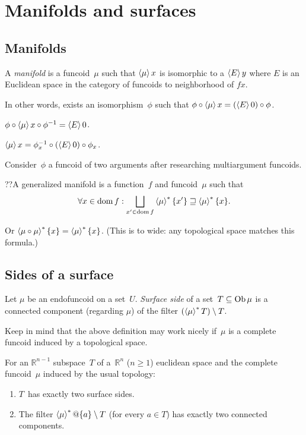 \chapter{Manifolds and surfaces}

\section{Manifolds}

\begin{defn}
 A \emph{manifold} is a funcoid~$\mu$
 such that
 $\left\langle \mu\right\rangle x$ is isomorphic to a $\left\langle E\right\rangle y$ where $E$ is an Euclidean space in the category of funcoids to
 neighborhood of $fx$.
\end{defn}

In other words, exists an isomorphism~$\phi$ such that
$\phi\circ\left\langle \mu\right\rangle x=(\left\langle E\right\rangle0)\circ\phi$.

$\phi\circ\left\langle \mu\right\rangle x\circ\phi^{-1}=\left\langle E\right\rangle0$.

$\left\langle \mu\right\rangle x=\phi_x^{-1}\circ(\left\langle E\right\rangle0)\circ\phi_x$.

Consider~$\phi$ a funcoid of two arguments after researching multiargument funcoids.

??A generalized manifold is a function~$f$ and funcoid~$\mu$
such that
\[
 \forall x\in\dom f: \bigsqcup_{x'\in\dom f}\rsupfun{\mu}\{x'\}\sqsupseteq\rsupfun{\mu}\{x\}.
\]

Or $\left\langle \mu\circ\mu\right\rangle ^{\ast}\{x\}=\left\langle \mu\right\rangle ^{\ast}\{x\}$.
(This is to wide: any topological space matches this formula.)

\section{Sides of a surface}

\begin{defn}
Let $\mu$ be an endofuncoid on a set~$U$.
\emph{Surface side} of a set~$T\subseteq\operatorname{Ob}\mu$ is a connected component
(regarding $\mu$) of the filter $(\left\langle \mu\right\rangle ^{\ast}T)\setminus T$.
\end{defn}

Keep in mind that the above definition may work nicely if~$\mu$ is
a complete funcoid induced by a topological space.

\begin{example}
For an $\mathbb{R}^{n-1}$ subspace~$T$ of a~$\mathbb{R}^n$ ($n\geq 1$)
euclidean space and the complete funcoid~$\mu$ induced by the usual topology:
\begin{enumerate}
\item $T$~has exactly two surface sides.
\item The filter $\left\langle \mu\right\rangle ^{\ast}@\{a\} \setminus T$ (for every $a\in T$)
  has exactly two connected components.
\end{enumerate}
\end{example}

